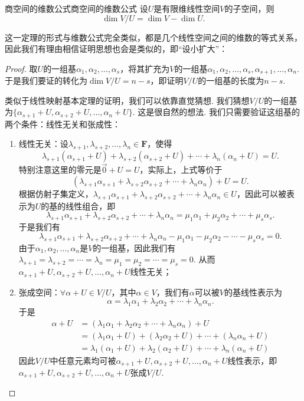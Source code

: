 \begin{theorem}{商空间的维数公式}{商空间的维数公式}
    设$U$是有限维线性空间$V$的子空间，则
    \[\dim V/U=\dim V-\dim U.\]
\end{theorem}

这一定理的形式与维数公式完全类似，都是几个线性空间之间的维数的等式关系，因此我们有理由相信证明思想也会是类似的，即``设小扩大''：

\begin{proof}
    取$U$的一组基$\alpha_1,\alpha_2,\ldots,\alpha_s$，将其扩充为$V$的一组基$\alpha_1,\alpha_2,\ldots,\alpha_s,\alpha_{s+1},\ldots,\alpha_n$. 于是我们要证的转化为$\dim V/U=n-s$，即证明$V/U$的一组基的长度为$n-s$.

    类似于线性映射基本定理的证明，我们可以依靠直觉猜想. 我们猜想$V/U$的一组基为$\{\alpha_{s+1}+U,\alpha_{s+2}+U,\ldots,\alpha_n+U\}$. 这是很自然的想法. 我们只需要验证这组基的两个条件：线性无关和张成性：
    \begin{enumerate}
        \item 线性无关：设$\lambda_{s+1},\lambda_{s+2},\ldots,\lambda_n\in\mathbf{F}$，使得
              \[\lambda_{s+1}(\alpha_{s+1}+U)+\lambda_{s+2}(\alpha_{s+2}+U)+\cdots+\lambda_n(\alpha_n+U)=U.\]
              特别注意这里的零元是$\vec{0}+U=U$，实际上，上式等价于
              \[(\lambda_{s+1}\alpha_{s+1}+\lambda_{s+2}\alpha_{s+2}+\cdots+\lambda_n\alpha_n)+U=U.\]
              根据仿射子集定义，$\lambda_{s+1}\alpha_{s+1}+\lambda_{s+2}\alpha_{s+2}+\cdots+\lambda_n\alpha_n\in U$，因此可以被表示为$U$的基的线性组合，即
              \[\lambda_{s+1}\alpha_{s+1}+\lambda_{s+2}\alpha_{s+2}+\cdots+\lambda_n\alpha_n=\mu_1\alpha_1+\mu_2\alpha_2+\cdots+\mu_s\alpha_s.\]
              于是我们有
              \[\lambda_{s+1}\alpha_{s+1}+\lambda_{s+2}\alpha_{s+2}+\cdots+\lambda_n\alpha_n-\mu_1\alpha_1-\mu_2\alpha_2-\cdots-\mu_s\alpha_s=0.\]
              由于$\alpha_1,\alpha_2,\ldots,\alpha_n$是$V$的一组基，因此我们有$\lambda_{s+1}=\lambda_{s+2}=\cdots=\lambda_n=\mu_1=\mu_2=\cdots=\mu_s=0$. 从而$\alpha_{s+1}+U,\alpha_{s+2}+U,\ldots,\alpha_n+U$线性无关；

        \item 张成空间：$\forall\alpha+U\in V/U$，其中$\alpha\in V$，我们有$\alpha$可以被$V$的基线性表示为
              \[\alpha=\lambda_1\alpha_1+\lambda_2\alpha_2+\cdots+\lambda_n\alpha_n.\]
              于是
              \begin{align*}
                  \alpha+U & =(\lambda_1\alpha_1+\lambda_2\alpha_2+\cdots+\lambda_n\alpha_n)+U         \\
                           & =(\lambda_1\alpha_1+U)+(\lambda_2\alpha_2+U)+\cdots+(\lambda_n\alpha_n+U) \\
                           & =\lambda_1(\alpha_1+U)+\lambda_2(\alpha_2+U)+\cdots+\lambda_n(\alpha_n+U)
              \end{align*}
              因此$V/U$中任意元素均可被$\alpha_{s+1}+U,\alpha_{s+2}+U,\ldots,\alpha_n+U$线性表示，即$\alpha_{s+1}+U,\alpha_{s+2}+U,\ldots,\alpha_n+U$张成$V/U$.
    \end{enumerate}
\end{proof}

